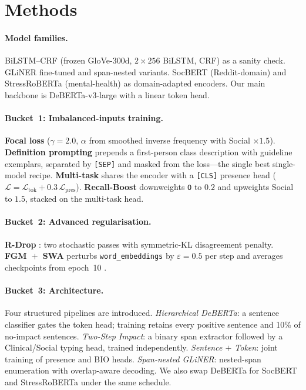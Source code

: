 \documentclass[11pt]{article}
\begin{document}
\section{Methods}
\label{sec:methods}

\paragraph{Model families.} BiLSTM--CRF (frozen GloVe-300d, $2\times256$
BiLSTM, CRF) as a sanity check. GLiNER \citep{zaratiana2024gliner}
fine-tuned and span-nested variants. SocBERT (Reddit-domain) and
StressRoBERTa (mental-health) as domain-adapted encoders. Our main
backbone is DeBERTa-v3-large with a linear token head.

\paragraph{Bucket~1: Imbalanced-inputs training.}
\textbf{Focal loss} ($\gamma=2.0$, $\alpha$ from smoothed inverse
frequency with Social $\times 1.5$). \textbf{Definition prompting}
prepends a first-person class description with guideline exemplars,
separated by \texttt{[SEP]} and masked from the loss---the single
best single-model recipe. \textbf{Multi-task} shares the encoder with
a \texttt{[CLS]} presence head ($\mathcal{L}=\mathcal{L}_{\text{tok}}+
0.3\,\mathcal{L}_{\text{pres}}$). \textbf{Recall-Boost} downweights
\texttt{O} to $0.2$ and upweights Social to $1.5$, stacked on the
multi-task head.

\paragraph{Bucket~2: Advanced regularisation.} \textbf{R-Drop}
\citep{liang2021rdrop}: two stochastic passes with symmetric-KL
disagreement penalty. \textbf{FGM~$+$~SWA} perturbs
\texttt{word\_embeddings} by $\varepsilon=0.5$ per step
\citep{miyato2017adversarial} and averages checkpoints from epoch~10
\citep{izmailov2018swa}.

\paragraph{Bucket~3: Architecture.} Four structured pipelines are introduced.
\emph{Hierarchical DeBERTa}: a sentence classifier gates the token
head; training retains every positive sentence and 10\% of no-impact
sentences. \emph{Two-Step Impact}: a binary span extractor followed by
a Clinical/Social typing head, trained independently. \emph{Sentence
$+$ Token}: joint training of presence and BIO heads.
\emph{Span-nested GLiNER}: nested-span enumeration with overlap-aware
decoding. We also swap DeBERTa for SocBERT and StressRoBERTa under the
same schedule.
\end{document}
